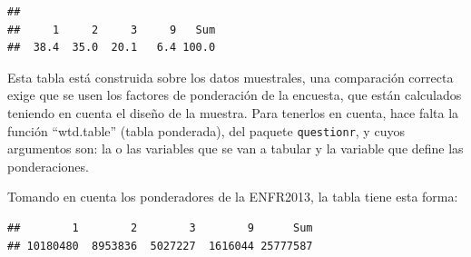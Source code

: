 \documentclass[]{book}
\newenvironment{Shaded}{\begin{snugshade}}{\end{snugshade}}
\newcommand{\DataTypeTok}[1]{\textcolor[rgb]{0.13,0.29,0.53}{#1}}
\newcommand{\DecValTok}[1]{\textcolor[rgb]{0.00,0.00,0.81}{#1}}
\newcommand{\KeywordTok}[1]{\textcolor[rgb]{0.13,0.29,0.53}{\textbf{#1}}}
\newcommand{\NormalTok}[1]{#1}
\newcommand{\OperatorTok}[1]{\textcolor[rgb]{0.81,0.36,0.00}{\textbf{#1}}}
\newcommand{\StringTok}[1]{\textcolor[rgb]{0.31,0.60,0.02}{#1}}
\begin{document}
\begin{Shaded}
\end{Shaded}

\begin{verbatim}
## 
##     1     2     3     9   Sum 
##  38.4  35.0  20.1   6.4 100.0
\end{verbatim}

Esta tabla está construida sobre los datos muestrales, una comparación correcta exige que se usen los factores de ponderación de la encuesta, que están calculados teniendo en cuenta el diseño de la muestra. Para tenerlos en cuenta, hace falta la función ``wtd.table'' (tabla ponderada), del paquete \texttt{questionr}, y cuyos argumentos son: la o las variables que se van a tabular y la variable que define las ponderaciones.

Tomando en cuenta los ponderadores de la ENFR2013, la tabla tiene esta forma:

\begin{Shaded}
\end{Shaded}

\begin{verbatim}
##        1        2        3        9      Sum 
## 10180480  8953836  5027227  1616044 25777587
\end{verbatim}

\begin{Shaded}
\end{Shaded}
\end{document}
